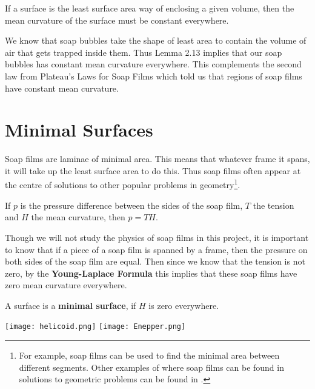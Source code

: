 \documentclass[a4paper,12pt]{report}
\begin{document}
\begin{lemma}
If a surface is the least surface area way of enclosing a given volume, then the mean curvature of the surface must be constant everywhere.
\end{lemma}

We know that soap bubbles take the shape of least area to contain the volume of air that gets trapped inside them. Thus Lemma 2.13 implies that our soap bubbles has constant mean curvature everywhere. This complements the second law from Plateau's Laws for Soap Films which told us that regions of soap films have constant mean curvature.

\section{Minimal Surfaces}

Soap films are laminae of minimal area. This means that whatever frame it spans, it will take up the least surface area to do this. Thus  soap films often appear at the centre of solutions to other popular problems in geometry\footnote{For example, soap films can be used to find the minimal area between different segments. Other examples of where soap films can be found in solutions to geometric problems can be found in \cite{soap}.}.

\begin{theorem}
If $p$ is the pressure difference between the sides of the soap film, $T$ the tension and $H$ the mean curvature, then $p = TH$.
\end{theorem}

Though we will not study the physics of soap films in this project, it is important to know that if a piece of a soap film is spanned by a frame, then the pressure on both sides of the soap film are equal. Then since we know that the tension is not zero, by the \textbf{Young-Laplace Formula} this implies that these soap films have zero mean curvature everywhere. 

\begin{definition}
A surface is a \textbf{minimal surface}, if $H$ is zero everywhere.
\end{definition}

\vspace{2cm}

\begin{center}
\texttt{[image: helicoid.png]}
\hspace{1cm}
\texttt{[image: Enepper.png]}
\vspace{-1cm}
\begin{multicols}{2}
\vspace{1cm}
\end{multicols}
\end{center}
\end{document}
